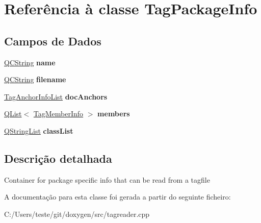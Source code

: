 \hypertarget{class_tag_package_info}{\section{Referência à classe Tag\-Package\-Info}
\label{class_tag_package_info}
}
\subsection*{Campos de Dados}
\begin{DoxyCompactItemize}
\item 
\hypertarget{class_tag_package_info_adc0097c7bd1e61ad32058fcde425bc7a}{\hyperlink{class_q_c_string}{Q\-C\-String} {\bfseries name}}\label{class_tag_package_info_adc0097c7bd1e61ad32058fcde425bc7a}

\item 
\hypertarget{class_tag_package_info_a99a47216e8094a3186f3d837ee0b1c25}{\hyperlink{class_q_c_string}{Q\-C\-String} {\bfseries filename}}\label{class_tag_package_info_a99a47216e8094a3186f3d837ee0b1c25}

\item 
\hypertarget{class_tag_package_info_a3a6c53fe1869a01e3748ec5898a54458}{\hyperlink{class_tag_anchor_info_list}{Tag\-Anchor\-Info\-List} {\bfseries doc\-Anchors}}\label{class_tag_package_info_a3a6c53fe1869a01e3748ec5898a54458}

\item 
\hypertarget{class_tag_package_info_acab433535ad1575dfbddf6796d2baf98}{\hyperlink{class_q_list}{Q\-List}$<$ \hyperlink{class_tag_member_info}{Tag\-Member\-Info} $>$ {\bfseries members}}\label{class_tag_package_info_acab433535ad1575dfbddf6796d2baf98}

\item 
\hypertarget{class_tag_package_info_af3bb2d0ed4b98f17279d80fdf29f77cb}{\hyperlink{class_q_string_list}{Q\-String\-List} {\bfseries class\-List}}\label{class_tag_package_info_af3bb2d0ed4b98f17279d80fdf29f77cb}

\end{DoxyCompactItemize}


\subsection{Descrição detalhada}
Container for package specific info that can be read from a tagfile 

A documentação para esta classe foi gerada a partir do seguinte ficheiro\-:\begin{DoxyCompactItemize}
\item 
C\-:/\-Users/teste/git/doxygen/src/tagreader.\-cpp\end{DoxyCompactItemize}
